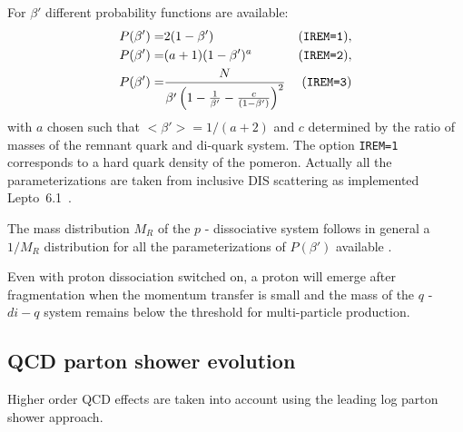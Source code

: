 \documentclass[10pt]{article} \usepackage{dina4}
\def\LEPTO{{\sc Lepto}}
\begin{document}
\par
 For  $\beta'$ different probability functions
are available: 
\begin{eqnarray}
P(\beta')  = & 2 (1 - \beta') & (\verb+IREM=1+),\\ 
P(\beta')  =  & (a+1) (1 - \beta')^a &(\verb+IREM=2+),\\
P(\beta')  =  & \frac{N}{ \beta'\left(1 - \frac{1}{\beta'} - 
          \frac{c}{(1 - \beta')}\right) ^2}& 
                (\verb+IREM=3+)
\end{eqnarray}
 with $a$ chosen such that 
$<\beta'> = 1/(a + 2)$ 
and  $c$ determined by the ratio of masses of the
remnant quark and di-quark system. The option \verb+IREM=1+ 
corresponds to a hard quark density of the pomeron.
Actually all the parameterizations are taken 
from inclusive DIS scattering as implemented 
\LEPTO\ 6.1~\cite{MEPS}.
\par
The  mass distribution $M_R$ of the $p$ - dissociative
system follows in general a $1/M_R$ distribution for all the 
parameterizations of $P(\beta')$ available \cite{Jung_Eilat}.
\par
Even with proton dissociation switched on, a proton will emerge after
fragmentation when 
the momentum transfer is small 
and the mass of the $q$ - $ di-q$ system remains below
the threshold for multi-particle production.

\subsection{QCD parton shower evolution}

Higher order QCD effects are taken into account using the leading log
parton shower approach.
\end{document}
